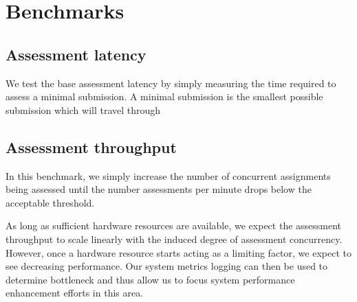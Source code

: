 \section{Benchmarks}

\subsection{Assessment latency}

We test the base assessment latency by simply measuring the time
required to assess a minimal submission. A minimal submission is the
smallest possible submission which will travel through 

\subsection{Assessment throughput}
In this benchmark, we simply increase the number of concurrent
assignments being assessed until the number assessments per minute
drops below the acceptable threshold.

As long as sufficient hardware resources are available, we expect the
assessment throughput to scale linearly with the induced degree of
assessment concurrency. However, once a hardware resource starts
acting as a limiting factor, we expect to see decreasing
performance. Our system metrics logging can then be used to determine
bottleneck and thus allow us to focus system performance enhancement
efforts in this area.






